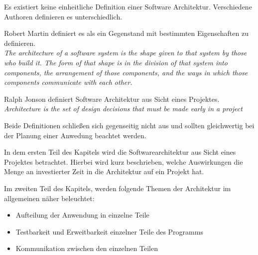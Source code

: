 Es existiert keine einheitliche Definition einer Software Architektur. 
Verschiedene Authoren definieren es unterschiedlich.

Robert Martin definiert es als ein Gegenstand mit bestimmten Eigenschaften zu definieren.\\
\textit{The architecture of a software system is the shape given to that system by those who build it. 
The form of that shape is in the division of that system into components, the arrangement of those components, 
and the ways in which those components communicate with each other.} \cite[136]{cleanArchitecture}

Ralph Jonson definiert Software Architektur aus Sicht eines Projektes.\\
\textit{Architecture is the set of design decisions that must be made early in a project}
\cite{MF_WhatIsSA}

Beide Definitionen schließen sich gegenseitig nicht aus und
sollten gleichwertig bei der Planung einer Anwedung beachtet werden.

In dem ersten Teil des Kapitels wird die Softwarearchitektur aus Sicht eines Projektes betrachtet.
Hierbei wird kurz beschrieben, welche Auswirkungen die Menge an investierter Zeit in die Architektur auf ein Projekt hat.

Im zweiten Teil des Kapitels, werden folgende Themen der Architektur im allgemeinen näher beleuchtet:
\begin{itemize}
    \item Aufteilung der Anwendung in einzelne Teile
    \item Testbarkeit und Erweitbarkeit einzelner Teile des Programms
    \item Kommunikation zwischen den einzelnen Teilen
\end{itemize}